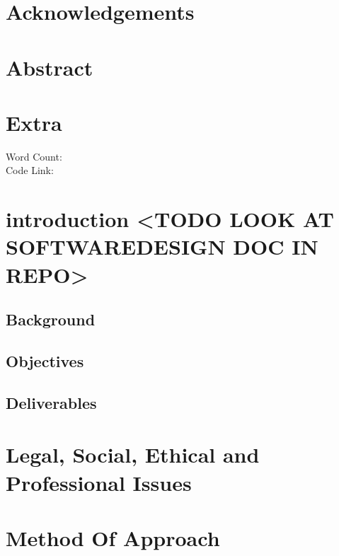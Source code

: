
\section*{Acknowledgements}

\section*{Abstract}

\section*{Extra}
Word Count:\\
Code Link:


\clearpage
{}
\tableofcontents
\clearpage
{}
\listoffigures
\clearpage


\section{introduction <TODO LOOK AT SOFTWAREDESIGN DOC IN REPO>}
\subsection{Background}
\subsection{Objectives}
\subsection{Deliverables}

\section{Legal, Social, Ethical and Professional Issues}

\section{Method Of Approach}

